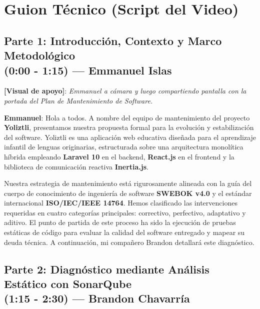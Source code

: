 \documentclass[12pt]{article}
\begin{document}
\section{Guion Técnico (Script del Video)}

\subsection{Parte 1: Introducción, Contexto y Marco Metodológico \texorpdfstring{\\}{---} (0:00 - 1:15) --- Emmanuel Islas}

\noindent \textbf{[Visual de apoyo]}: \textit{Emmanuel a cámara y luego compartiendo pantalla con la portada del Plan de Mantenimiento de Software.}
\medskip

\begin{sloppypar}
\noindent \textbf{Emmanuel}: Hola a todos. A nombre del equipo de mantenimiento del proyecto \textbf{Yoliztli}, presentamos nuestra propuesta formal para la evolución y estabilización del software. Yoliztli es una aplicación web educativa diseñada para el aprendizaje infantil de lenguas originarias, estructurada sobre una arquitectura monolítica híbrida empleando \textbf{Laravel 10} en el backend, \textbf{React.js} en el frontend y la biblioteca de comunicación reactiva \textbf{Inertia.js}.
\end{sloppypar}

\begin{sloppypar}
Nuestra estrategia de mantenimiento está rigurosamente alineada con la guía del cuerpo de conocimiento de ingeniería de software \textbf{SWEBOK v4.0} y el estándar internacional \textbf{ISO/IEC/IEEE 14764}. Hemos clasificado las intervenciones requeridas en cuatro categorías principales: correctivo, perfectivo, adaptativo y aditivo. El punto de partida de este proceso ha sido la ejecución de pruebas estáticas de código para evaluar la calidad del software entregado y mapear su deuda técnica. A continuación, mi compañero Brandon detallará este diagnóstico.
\end{sloppypar}

\newpage

\subsection{Parte 2: Diagnóstico mediante Análisis Estático con SonarQube \texorpdfstring{\\}{---} (1:15 - 2:30) --- Brandon Chavarría}
\end{document}
